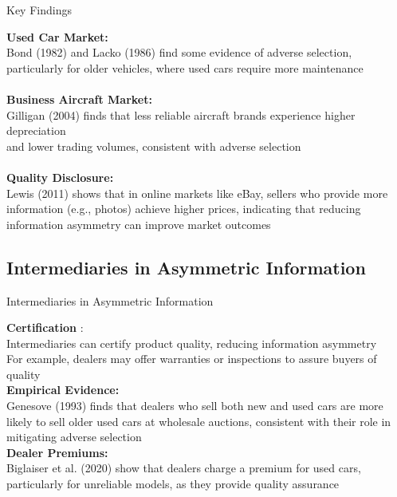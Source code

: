 \documentclass[aspectratio=169]{beamer}  %
\begin{document}
 

\begin{frame}{Key Findings}{  }
\begin{spacing}{1.25}
 
{\small
\textbf{Used Car Market:} \\
Bond (1982) and Lacko (1986) find some evidence of adverse selection, \\particularly for older vehicles, where used cars require more maintenance\\  
\quad\\
\textbf{Business Aircraft Market: }\\
Gilligan (2004) finds that less reliable aircraft brands experience higher depreciation \\and lower trading volumes, consistent with adverse selection\\
\quad\\
\textbf{Quality Disclosure:} \\
Lewis (2011) shows that in online markets like eBay, sellers who provide more information (e.g., photos) achieve higher prices, indicating that reducing information asymmetry can improve market outcomes\\
}
\end{spacing}
\end{frame}

 
\subsection{Intermediaries in Asymmetric Information}
 \begin{frame}{Intermediaries in Asymmetric Information}{}
\begin{spacing}{1.5}
 
{\small
\textbf{Certification }:\\
Intermediaries can certify product quality, reducing information asymmetry\\
For example, dealers may offer warranties or inspections to assure buyers of quality\\
\textbf{Empirical Evidence:}\\
Genesove (1993) finds that dealers who sell both new and used cars are more likely to sell older used cars at wholesale auctions, consistent with their role in mitigating adverse selection\\
\textbf{Dealer Premiums:}\\
Biglaiser et al. (2020) show that dealers charge a premium for used cars, particularly for unreliable models, as they provide quality assurance
  

}
\end{spacing}
\end{frame}
\end{document}
